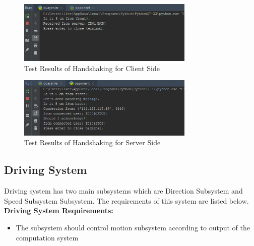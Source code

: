 \documentclass[a4paper,12pt]{article}
\begin{document}
	
	
	\begin{figure}[H]
		\center
		\setlength{\unitlength}{\textwidth} 				\includegraphics[width=0.75\textwidth]{images/handshake1}
		\caption{\label{fig:handshake1}Test Results of Handshaking for Client Side}
	\end{figure}
	
	\begin{figure}[H]
		\center
		\setlength{\unitlength}{\textwidth} 
		\includegraphics[width=0.75\textwidth]{images/handshake2}
		\caption{\label{fig:handshake2}Test Results of Handshaking for Server Side}
	\end{figure}	
	
	\subsection{Driving System}
	
	Driving system has two main subsystems which are Direction Subsystem and Speed Subsystem Subsystem. The requirements of this system are listed below.\\
	
	\textbf{Driving System Requirements:}
	\begin{itemize}
		\item The subsystem should control motion subsystem according to output of the computation system
	\end{itemize}
	
	
	
	
\end{document}

